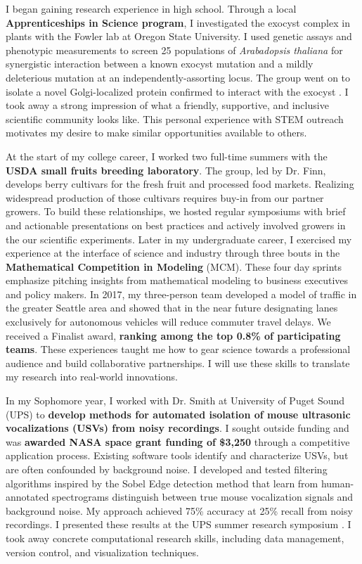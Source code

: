 \noindent
\underline{}
I began gaining research experience in high school.
Through a local \textbf{Apprenticeships in Science program}, I investigated the exocyst complex in plants with the Fowler lab at Oregon State University.
I used genetic assays and phenotypic measurements to screen 25 populations of \textit{Arabadopsis thaliana} for synergistic interaction between a known exocyst mutation and a mildly deleterious mutation at an independently-assorting locus.
The group went on to isolate a novel Golgi-localized protein confirmed to interact with the exocyst \cite{fowler}.
I took away a strong impression of what a friendly, supportive, and inclusive scientific community looks like.
This personal experience with STEM outreach motivates my desire to make similar opportunities available to others.

At the start of my college career, I worked two full-time summers with the \textbf{USDA small fruits breeding laboratory}.
The group, led by Dr. Finn, develops berry cultivars for the fresh fruit and processed food markets.
Realizing widespread production of those cultivars requires buy-in from our partner growers.
To build these relationships, we hosted regular symposiums with brief and actionable presentations on best practices and actively involved growers in the our scientific experiments.
Later in my undergraduate career, I exercised my experience at the interface of science and industry through three bouts in the \textbf{Mathematical Competition in Modeling} (MCM).
These four day sprints emphasize pitching insights from mathematical modeling to business executives and policy makers.
In 2017, my three-person team developed a model of traffic in the greater Seattle area and showed that in the near future designating lanes exclusively for autonomous vehicles will reduce commuter travel delays.
We received a Finalist award, \textbf{ranking among the top 0.8\% of participating teams}.
These experiences taught me how to gear science towards a professional audience and build collaborative partnerships.
I will use these skills to translate my research into real-world innovations.

In my Sophomore year, I worked with Dr. Smith at University of Puget Sound (UPS) to \textbf{develop methods for automated isolation of mouse
ultrasonic vocalizations (USVs) from noisy recordings}.
I sought outside funding and was \textbf{awarded NASA space grant funding of \$3,250} through a competitive application process.
Existing software tools identify and characterize USVs, but are often confounded by background noise.
I developed and tested filtering algorithms inspired by the Sobel Edge detection method that learn from human-annotated spectrograms distinguish between true mouse vocalization signals and background noise.
My approach achieved 75\% accuracy at 25\% recall from noisy recordings.
I presented these results at the UPS summer research symposium \cite{smith}.
I took away concrete computational research skills, including data management, version control, and visualization techniques.

